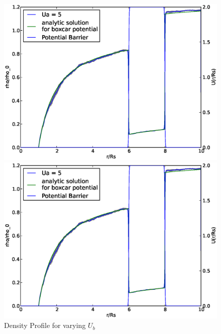\begin{figure}[H]
\begin{minipage}{.5 \textwidth}
    \includegraphics[width=.95 \textwidth, keepaspectratio]{plots/cp/ub/Ua5.eps}
\end{minipage}\begin{minipage}{.5 \textwidth}
    \includegraphics[width=.95 \textwidth, keepaspectratio]{plots/cp/ub/Ua5.eps}
\end{minipage}
 
    \caption{Density Profile for varying $U_b$}
    \label{fig:RhoUbCp}
\end{figure}


